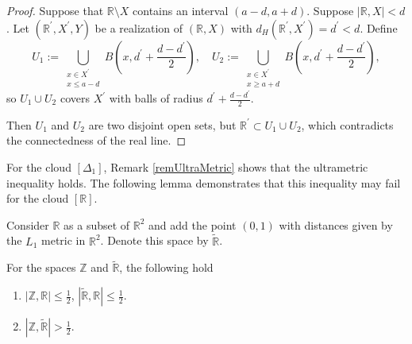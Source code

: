 \documentclass[leqno]{article}
\begin{document}
\begin{proof}
    Suppose that
    $\mathbb{R} \setminus X$ contains an interval $(a-d, a+d)$. Suppose
    $|\mathbb{R}, X|<d$. Let $(\mathbb{R}^{\prime}, X^{\prime}, Y)$ be
    a realization of $(\mathbb{R}, X)$ with $d_H(\mathbb{R}^{\prime},
    X^{\prime}) = d^{\prime}<d$. Define
    $$
    U_1 := \bigcup_{\substack{x \in X^{\prime} \\ x \leq a-d}}
    B\left(x, d^{\prime}+\frac{d-d^{\prime}}{2}\right), \quad
    U_2 := \bigcup_{\substack{x \in X^{\prime} \\ x \geq a+d}}
    B\left(x, d^{\prime}+\frac{d-d^{\prime}}{2}\right),
    $$
    so $U_1 \cup U_2$ covers $X^{\prime}$ with balls of radius
    $d^\prime + \frac{d-d^{\prime}}{2}$.

    Then $U_1$ and $U_2$ are two disjoint open sets, but
    $\mathbb{R}^{\prime} \subset U_1 \cup U_2$, which contradicts the
    connectedness of the real line.
\end{proof}

For the cloud $[\Delta_{1}]$, Remark \ref{remUltraMetric} shows that
the ultrametric inequality holds. The following lemma demonstrates
that this inequality may fail for the cloud $[\mathbb{R}]$.

Consider $\mathbb{R}$ as a subset of $\mathbb{R}^2$ and add the point
$(0,1)$ with distances given by the $L_1$ metric in $\mathbb{R}^2$.
Denote this space by $\widetilde{\mathbb{R}}$.

\begin{theorem}\label{thrmRUltraMetric}
    For the spaces $\mathbb{Z}$ and $\widetilde{\mathbb{R}}$, the
    following hold\/\rom{:}
    \begin{enumerate}
        \item $|\mathbb{Z}, \mathbb{R}| \le \frac{1}{2}$,
            $|\widetilde{\mathbb{R}}, \mathbb{R}| \le
            \frac{1}{2}$.\label{thrmPt:1}
        \item $|\mathbb{Z}, \widetilde{\mathbb{R}}|>
            \frac{1}{2}$.\label{thrmPt:2}
    \end{enumerate}
\end{theorem}
\end{document}
